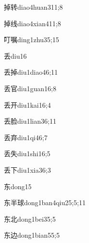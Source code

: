 \begin{verbete}{掉转}{diao4huan3}{11;8}
\end{verbete}
\begin{verbete}{掉线}{diao4xian4}{11;8}
\end{verbete}
\begin{verbete}{叮嘱}{ding1zhu3}{5;15}
\end{verbete}
\begin{verbete}{丢}{diu1}{6}
\end{verbete}
\begin{verbete}{丢掉}{diu1diao4}{6;11}
\end{verbete}
\begin{verbete}{丢官}{diu1guan1}{6;8}
\end{verbete}
\begin{verbete}{丢开}{diu1kai1}{6;4}
\end{verbete}
\begin{verbete}{丢脸}{diu1lian3}{6;11}
\end{verbete}
\begin{verbete}{丢弃}{diu1qi4}{6;7}
\end{verbete}
\begin{verbete}{丢失}{diu1shi1}{6;5}
\end{verbete}
\begin{verbete}{丢下}{diu1xia3}{6;3}
\end{verbete}
\begin{verbete}{东}{dong1}{5}
\end{verbete}
\begin{verbete}{东半球}{dong1ban4qiu2}{5;5;11}
\end{verbete}
\begin{verbete}{东北}{dong1bei3}{5;5}
\end{verbete}
\begin{verbete}{东边}{dong1bian5}{5;5}
\end{verbete}

